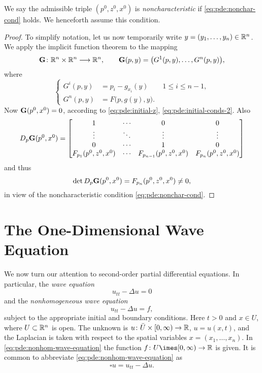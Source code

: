 We say the admissible triple \((p^0,z^0,x^0)\) is \emph{noncharacteristic}
if \eqref{eq:pde:nonchar-cond} holds. We henceforth assume this condition.
\begin{proof}
  To simplify notation, let us now temporarily write
  \(y=(y_1,\dotsc,y_n)\in\mathbb{R}^n\). We apply the implicit function theorem
  to the mapping
  \[
    \mathbf{G}\colon\mathbb{R}^n\times\mathbb{R}^n\longrightarrow\mathbb{R}^n,\qquad
    \mathbf{G}(p,y)=\bigl(G^1(p,y),\dotsc,G^n(p,y)\bigr),
  \]
  where
  \[
    \left\{
      \begin{aligned}
        G^i(p,y)&=p_i-g_{x_i}(y)\qquad 1\leq i\leq n-1,\\
        G^n(p,y)&=F\bigl(p,g(y),y\bigr).
      \end{aligned}
    \right.
  \]
  Now \(\mathbf{G}(p^0,x^0)=0\), according to \eqref{eq:pde:initial-z},
  \eqref{eq:pde:initial-conds-2}. Also
  \[
    D_p\mathbf{G}(p^0,x^0)
    =
    \begin{bmatrix}
      1&\cdots&0&0\\
      \vdots&\ddots&\vdots&\vdots\\
      0&\cdots&1&0\\
      F_{p_1}(p^0,z^0,x^0)&\cdots&F_{p_{n-1}}(p^0,z^0,x^0)&F_{p_n}(p^0,z^0,x^0)
    \end{bmatrix}
  \]
  and thus
  \[
    \det D_p\mathbf{G}(p^0,x^0)=F_{p_n}(p^0,z^0,x^0)\neq 0,
  \]
  in view of the noncharacteristic condition \eqref{eq:pde:nonchar-cond}.
\end{proof}

\section{The One-Dimensional Wave Equation}
We now turn our attention to second-order partial differential
equations. In particular, the \emph{wave equation}
\begin{equation}
  \label{eq:pde:wave-equation}
  u_{tt}-\Delta u=0
\end{equation}
and the \emph{nonhomogeneous wave equation}
\begin{equation}
  \label{eq:pde:nonhom-wave-equation}
  u_{tt}-\Delta u=f,
\end{equation}
subject to the appropriate initial and boundary conditions. Here \(t>0\)
and \(x\in U\), where \(U\subset\mathbb{R}^n\) is open. The unknown is
\(u\colon \bar U\times[0,\infty)\to\mathbb{R}\), \(u=u(x,t)\), and the Laplacian
is taken with respect to the spatial variables \(x=(x_1,\dotsc,x_n)\). In
\eqref{eq:pde:nonhom-wave-equation} the function
\(f\colon U\imes[0,\infty)\to\bbR\) is given. It is common to abbreviate
\eqref{eq:pde:nonhom-wave-equation} as
\[
  \square u=u_{tt}-\Delta u.
\]

